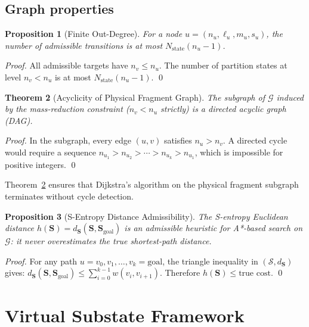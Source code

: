 \documentclass[twocolumn,10pt,a4paper]{article}
\theoremstyle{thmstyle}
\newtheorem{theorem}{Theorem}[section]
\newtheorem{proposition}[theorem]{Proposition}
\theoremstyle{definition}
\theoremstyle{remark}
\newcommand{\Sv}{\mathbf{S}}
\newcommand{\calS}{\mathcal{S}}
\newcommand{\calG}{\mathcal{G}}
\begin{document}
\subsection{Graph properties}

\begin{proposition}[Finite Out-Degree]
\label{prop:outdegree}
For a node $u = (n_u,\ell_u,m_u,s_u)$, the number of admissible
transitions is at most $N_\text{state}(n_u - 1)$.
\end{proposition}

\begin{proof}
All admissible targets have $n_v \leq n_u$. The number of partition
states at level $n_v < n_u$ is at most $N_\text{state}(n_u - 1)$.
\qed
\end{proof}

\begin{theorem}[Acyclicity of Physical Fragment Graph]
\label{thm:acyclic}
The subgraph of $\calG$ induced by the mass-reduction constraint
($n_v < n_u$ strictly) is a directed acyclic graph (DAG).
\end{theorem}

\begin{proof}
In the subgraph, every edge $(u,v)$ satisfies $n_u > n_v$. A directed
cycle would require a sequence $n_{u_1} > n_{u_2} > \cdots > n_{u_k} >
n_{u_1}$, which is impossible for positive integers. \qed
\end{proof}

Theorem~\ref{thm:acyclic} ensures that Dijkstra's algorithm on the
physical fragment subgraph terminates without cycle detection.

\begin{proposition}[S-Entropy Distance Admissibility]
\label{prop:admissible-heuristic}
The S-entropy Euclidean distance $h(\Sv) = d_{\Sv}(\Sv, \Sv_\text{goal})$
is an admissible heuristic for A*-based search on $\calG$: it never
overestimates the true shortest-path distance.
\end{proposition}

\begin{proof}
For any path $u = v_0, v_1, \ldots, v_k = \text{goal}$, the triangle
inequality in $(\calS, d_{\Sv})$ gives:
$d_{\Sv}(\Sv, \Sv_\text{goal}) \leq \sum_{i=0}^{k-1} w(v_i, v_{i+1})$.
Therefore $h(\Sv) \leq \text{true cost}$. \qed
\end{proof}

\section{Virtual Substate Framework}
\label{sec:virtual}
\end{document}

